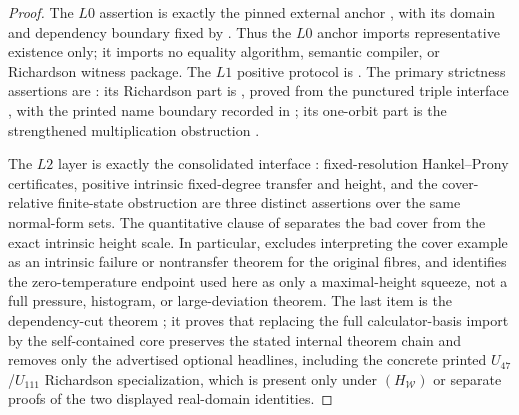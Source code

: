 \begin{proof}
The \(L0\) assertion is exactly the pinned external anchor
, with its domain and dependency boundary fixed by
.
Thus the \(L0\) anchor imports representative existence only; it imports no
equality algorithm, semantic compiler, or Richardson witness package.  The
\(L1\) positive protocol is
.  The primary
strictness assertions are : its
Richardson part is , proved from the punctured triple
interface
,
with the printed name boundary recorded in
;
its one-orbit part is the strengthened multiplication obstruction
.

The \(L2\) layer is exactly the consolidated interface
: fixed-resolution Hankel--Prony certificates,
positive intrinsic fixed-degree transfer and height, and the cover-relative
finite-state obstruction are three distinct assertions over the same normal-form
sets.  The quantitative clause of 
separates the bad cover from the exact intrinsic height scale.  In particular,
 excludes
interpreting the cover example as an intrinsic failure or nontransfer theorem for
the original fibres, and 
identifies the zero-temperature endpoint used here as only a maximal-height
squeeze, not a full pressure, histogram, or large-deviation theorem.  The last
item is the dependency-cut theorem
; it proves that replacing the full
  calculator-basis import by the self-contained core preserves the stated
  internal theorem chain and removes only the advertised optional headlines,
  including the concrete printed \(U_{47}\)/\(U_{111}\) Richardson specialization,
  which is present only under \((H_{\mathcal W})\) or separate proofs of the two
  displayed real-domain identities.
\end{proof}

